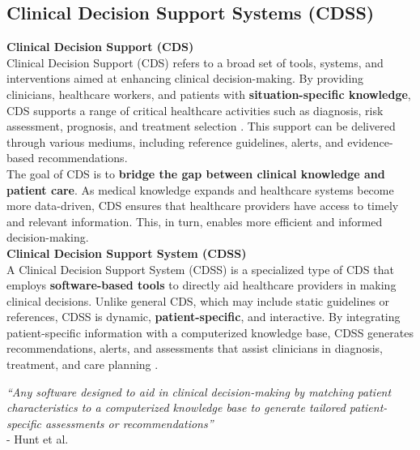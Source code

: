 \subsection{Clinical Decision Support Systems (CDSS)}
\textcolor{TUMBlue}{\textbf{Clinical Decision Support (CDS)}}\\
\noindent Clinical Decision Support (CDS) refers to a broad set of tools, systems, and interventions aimed at enhancing clinical decision-making. By providing clinicians, healthcare workers, and patients with \textcolor{TUMRed}{\textbf{situation-specific knowledge}}, CDS supports a range of critical healthcare activities such as diagnosis, risk assessment, prognosis, and treatment selection \cite{osheroff2007roadmap}. This support can be delivered through various mediums, including reference guidelines, alerts, and evidence-based recommendations.\\[\baselineskip]

\noindent The goal of CDS is to \textcolor{TUMRed}{\textbf{bridge the gap between clinical knowledge and patient care}}. As medical knowledge expands and healthcare systems become more data-driven, CDS ensures that healthcare providers have access to timely and relevant information. This, in turn, enables more efficient and informed decision-making.\\[\baselineskip]

\noindent \textcolor{TUMBlue}{\textbf{Clinical Decision Support System (CDSS)}}\\
A Clinical Decision Support System (CDSS) is a specialized type of CDS that employs \textcolor{TUMRed}{\textbf{software-based tools}} to directly aid healthcare providers in making clinical decisions. Unlike general CDS, which may include static guidelines or references, CDSS is dynamic, \textcolor{TUMRed}{\textbf{patient-specific}}, and interactive. By integrating patient-specific information with a computerized knowledge base, CDSS generates recommendations, alerts, and assessments that assist clinicians in diagnosis, treatment, and care planning \cite{hunt1998effects}.

\begin{mdframed}[backgroundcolor=black!10]
    \centering
    \textit{“Any software designed to aid in clinical decision-making by matching patient characteristics to a computerized knowledge base to generate tailored patient-specific assessments or recommendations”}\\
    \flushright
    -  Hunt et al. \cite{hunt1998effects}
\end{mdframed}

